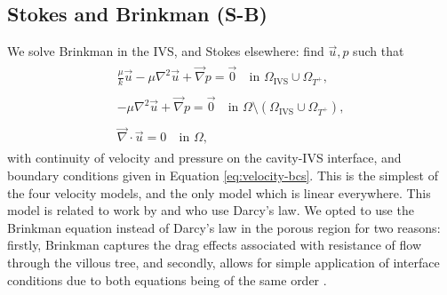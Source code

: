         \subsection{Stokes and Brinkman (S-B)} \label{sec:modelling:blood-flow:s+b}
            We solve Brinkman in the IVS, and Stokes elsewhere: find $\vec{u}, p$ such that
            \begin{subequations}
                \begin{align}
                    \begin{split}
                        \frac{\mu}{k} \vec{u} -\mu\nabla^2 \vec{u} + \vec{\nabla} p = \vec{0} &~ \text{in } \Omega_{\text{IVS}} \cup \Omega_{T^+},
                    \end{split}\\
                    \begin{split}
                        -\mu\nabla^2 \vec{u} + \vec{\nabla} p = \vec{0} &~ \text{in } \Omega \setminus (\Omega_{\text{IVS}} \cup \Omega_{T^+}),
                    \end{split}\\
                    \begin{split}
                        \vec{\nabla} \cdot \vec{u} = 0 &~ \text{in } \Omega,
                    \end{split}%
                \end{align}%
                \label{eq:s-b}%
            \end{subequations}%
            with continuity of velocity and pressure on the cavity-IVS interface, and boundary conditions given in Equation \ref{eq:velocity-bcs}. This is the simplest of the four velocity models, and the only model which is linear everywhere. This model is related to work by \citeauthor{chernyavskyMathematicalModelIntervillous2010} \cite{chernyavskyMathematicalModelIntervillous2010} and \citeauthor{erianMaternalPlacentalBlood1977} \cite{erianMaternalPlacentalBlood1977} who use Darcy's law. We opted to use the Brinkman equation instead of Darcy's law in the porous region for two reasons: firstly, Brinkman captures the drag effects associated with resistance of flow through the villous tree, and secondly, allows for simple application of interface conditions due to both equations being of the same order \cite{brinkmanCalculationViscousForce1949}. 


